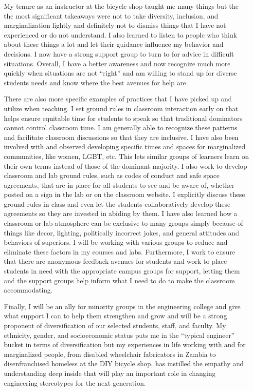 \documentclass{article}
\begin{document}
My tenure as an instructor at the bicycle shop taught me many things but the
the most significant takeaways were not to take diversity, inclusion, and
marginalization lightly and definitely not to dismiss things that I have not
experienced or do not understand. I also learned to listen to people who think
about these things a lot and let their guidance influence my behavior and
decisions. I now have a strong support group to turn to for advice in difficult
situations. Overall, I have a better awareness and now recognize much more
quickly when situations are not ``right'' and am willing to stand up for
diverse students needs and know where the best avenues for help are.

There are also more specific examples of practices that I have picked up and
utilize when teaching. I set ground rules in classroom interaction early on
that helps ensure equitable time for students to speak so that traditional
dominators cannot control classroom time. I am generally able to recognize
these patterns and facilitate classroom discussions so that they are inclusive.
I have also been involved with and observed developing specific times and
spaces for marginalized communities, like women, LGBT, etc. This lets similar
groups of learners learn on their own terms instead of those of the dominant
majority. I also work to develop classroom and lab ground rules, such as codes
of conduct and safe space agreements, that are in place for all students to see
and be aware of, whether posted on a sign in the lab or on the classroom
website. I explicitly discuss these ground rules in class and even let the
students collaboratively develop these agreements so they are invested in
abiding by them. I have also learned how a classroom or lab atmosphere can be
exclusive to many groups simply because of things like decor, lighting,
politically incorrect jokes, and general attitudes and behaviors of superiors.
I will be working with various groups to reduce and eliminate these factors in
my courses and labs. Furthermore, I work to ensure that there are anonymous
feedback avenues for students and work to place students in need with the
appropriate campus groups for support, letting them and the support groups help
inform what I need to do to make the classroom accommodating.

Finally, I will be an ally for minority groups in the engineering college and
give what support I can to help them strengthen and grow and will be a strong
proponent of diversification of our selected students, staff, and faculty. My
ethnicity, gender, and socioeconomic status puts me in the ``typical engineer''
bucket in terms of diversification but my experiences in life working with and
for marginalized people, from disabled wheelchair fabricators in Zambia to
disenfranchised homeless at the DIY bicycle shop, has instilled the empathy and
understanding deep inside that will play an important role in changing
engineering stereotypes for the next generation.
\end{document}
